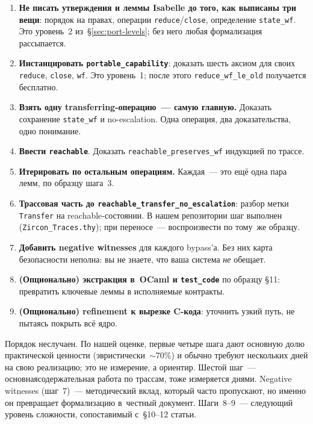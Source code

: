 \documentclass[11pt,a4paper]{article}
\begin{document}
\begin{enumerate}[leftmargin=1.4em]
	\item \textbf{Не писать утверждения и леммы Isabelle до того, как выписаны три вещи}: порядок
	      на правах, операции \texttt{reduce}/\texttt{close}, определение
	      \texttt{state\_wf}. Это уровень~2 из~\S\ref{sec:port-levels}; без
	      него любая формализация рассыпается.
	\item \textbf{Инстанцировать \texttt{portable\_capability}}: доказать
	      шесть аксиом для своих \texttt{reduce}, \texttt{close},
	      \texttt{wf}. Это уровень~1; после этого \texttt{reduce\_wf\_le\_old}
	      получается бесплатно.
	\item \textbf{Взять одну transferring-операцию~--- самую главную.}
	      Доказать сохранение \texttt{state\_wf} и no-escalation.
	      Одна операция, два доказательства, одно понимание.
	\item \textbf{Ввести \texttt{reachable}}. Доказать
	      \texttt{reachable\_preserves\_wf} индукцией по трассе.
	\item \textbf{Итерировать по остальным операциям.} Каждая~--- это ещё
	      одна пара лемм, по образцу шага~3.
	\item \textbf{Трассовая часть до
		      \texttt{reachable\_transfer\_no\_escalation}}: разбор метки
	      \texttt{Transfer} на reachable-состоянии. В нашем репозитории
	      шаг выполнен (\texttt{Zircon\_Traces.thy}); при переносе~---
	      воспроизвести по тому~же образцу.
	\item \textbf{Добавить negative witnesses} для каждого bypass'а. Без
	      них карта безопасности неполна: вы не знаете, что ваша система
	      \emph{не} обещает.
	\item \textbf{(Опционально) экстракция в~OCaml и \texttt{test\_code}} по
	      образцу §11: превратить ключевые леммы в исполняемые контракты.
	\item \textbf{(Опционально) refinement к вырезке C-кода}: уточнить
	      узкий путь, не пытаясь покрыть всё ядро.
\end{enumerate}

Порядок неслучаен. По нашей оценке, первые четыре шага дают основную
долю практической ценности (эвристически~$\sim$70\%) и обычно требуют
нескольких дней на свою реализацию; это не измерение, а ориентир.
Шестой шаг~--- основнаясодержательная работа по трассам, тоже измеряется днями. Negative
witnesses (шаг~7)~--- методический вклад, который часто пропускают, но
именно он превращает формализацию в~честный документ. Шаги~8--9~---
следующий уровень сложности, сопоставимый с~§10--12 статьи.
\end{document}
